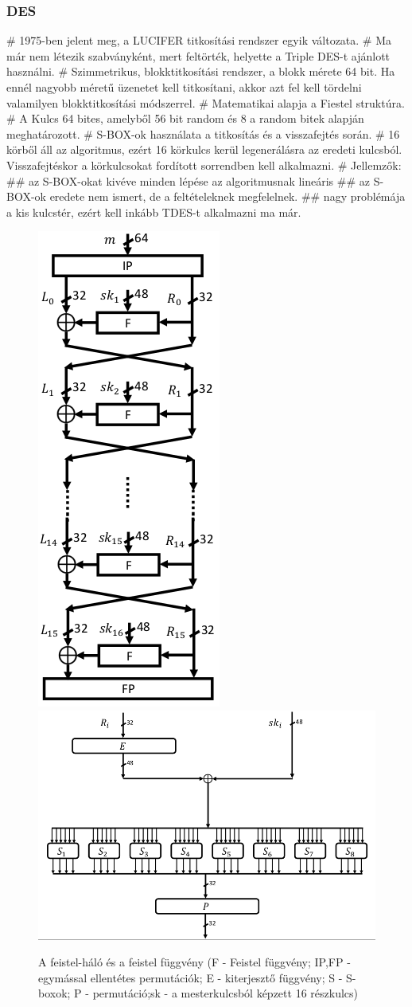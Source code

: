 \subsubsection{DES}
\begin{multicols}{2}
\begin{easylist}[itemize]
# 1975-ben jelent meg, a LUCIFER titkosítási rendszer egyik változata.
# Ma már nem létezik szabványként, mert feltörték, helyette a Triple DES-t ajánlott használni. 
# Szimmetrikus, blokktitkosítási rendszer, a blokk mérete 64 bit. Ha ennél nagyobb méretű üzenetet kell titkosítani, akkor azt fel kell tördelni valamilyen blokktitkosítási módszerrel.
# Matematikai alapja a Fiestel struktúra.
# A Kulcs 64 bites, amelyből 56 bit random és 8 a random bitek alapján meghatározott. 
# S-BOX-ok használata a titkosítás és a visszafejtés során.
# 16 körből áll az algoritmus, ezért 16 körkulcs kerül legenerálásra az eredeti kulcsból. Visszafejtéskor a körkulcsokat fordított sorrendben kell alkalmazni.
# Jellemzők:
## az S-BOX-okat kivéve minden lépése az algoritmusnak lineáris
## az S-BOX-ok eredete nem ismert, de a feltételeknek megfelelnek.
## nagy problémája a kis kulcstér, ezért kell inkább TDES-t alkalmazni ma már.
\end{easylist}
\end{multicols}
\begin{figure}[h]
	\centering
	\includegraphics[width=0.2\linewidth]{fig/14-DES_Feistel_net}
	\includegraphics[width=0.7\linewidth]{fig/14-DES_Feistel_func}
	\caption{A feistel-háló és a feistel függvény (F - Feistel függvény; IP,FP - egymással ellentétes permutációk; E - kiterjesztő függvény; S - S-boxok; P - permutáció;sk - a mesterkulcsból képzett 16 részkulcs)}
	\label{fig:14-desfeistelnet}
\end{figure}

